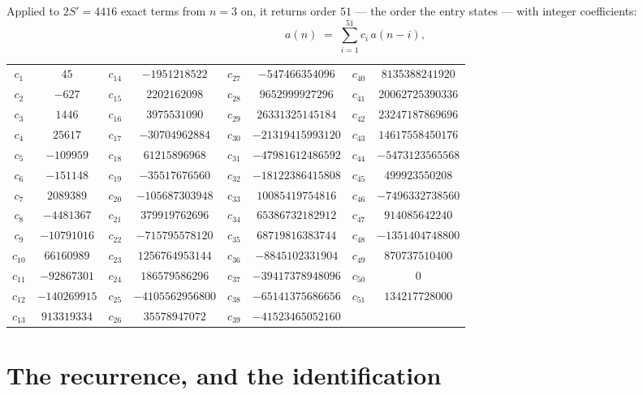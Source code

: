 \documentclass[11pt,a4paper]{article}
\theoremstyle{plain}
\theoremstyle{definition}
\begin{document}
Applied to $2S'=4416$ exact terms from $n=3$ on, it returns order $51$ --- the
order the entry states --- with integer coefficients:
\[
a(n)\;=\;\sum_{i=1}^{51}c_i\,a(n-i),
\]
\begin{center}\small
\begin{tabular}{cccccccc}
$c_{1}$ & $45$ & $c_{14}$ & $-1951218522$ & $c_{27}$ & $-547466354096$ & $c_{40}$ & $8135388241920$ \\
$c_{2}$ & $-627$ & $c_{15}$ & $2202162098$ & $c_{28}$ & $9652999927296$ & $c_{41}$ & $20062725390336$ \\
$c_{3}$ & $1446$ & $c_{16}$ & $3975531090$ & $c_{29}$ & $26331325145184$ & $c_{42}$ & $23247187869696$ \\
$c_{4}$ & $25617$ & $c_{17}$ & $-30704962884$ & $c_{30}$ & $-21319415993120$ & $c_{43}$ & $14617558450176$ \\
$c_{5}$ & $-109959$ & $c_{18}$ & $61215896968$ & $c_{31}$ & $-47981612486592$ & $c_{44}$ & $-5473123565568$ \\
$c_{6}$ & $-151148$ & $c_{19}$ & $-35517676560$ & $c_{32}$ & $-18122386415808$ & $c_{45}$ & $499923550208$ \\
$c_{7}$ & $2089389$ & $c_{20}$ & $-105687303948$ & $c_{33}$ & $10085419754816$ & $c_{46}$ & $-7496332738560$ \\
$c_{8}$ & $-4481367$ & $c_{21}$ & $379919762696$ & $c_{34}$ & $65386732182912$ & $c_{47}$ & $914085642240$ \\
$c_{9}$ & $-10791016$ & $c_{22}$ & $-715795578120$ & $c_{35}$ & $68719816383744$ & $c_{48}$ & $-1351404748800$ \\
$c_{10}$ & $66160989$ & $c_{23}$ & $1256764953144$ & $c_{36}$ & $-8845102331904$ & $c_{49}$ & $870737510400$ \\
$c_{11}$ & $-92867301$ & $c_{24}$ & $186579586296$ & $c_{37}$ & $-39417378948096$ & $c_{50}$ & $0$ \\
$c_{12}$ & $-140269915$ & $c_{25}$ & $-4105562956800$ & $c_{38}$ & $-65141375686656$ & $c_{51}$ & $134217728000$ \\
$c_{13}$ & $913319334$ & $c_{26}$ & $35578947072$ & $c_{39}$ & $-41523465052160$ &  &  \\
\end{tabular}
\end{center}

\section{The recurrence, and the identification}
\end{document}
